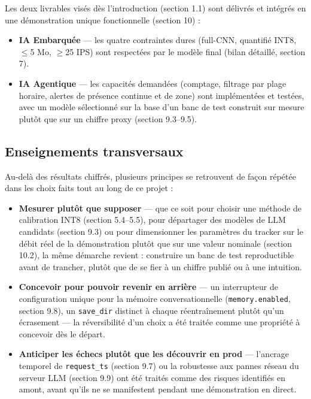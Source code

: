 \documentclass[11pt,a4paper]{article}
\let\Oldsubsection\subsection
\renewcommand{\subsection}{\FloatBarrier\Oldsubsection}
\begin{document}
    Les deux livrables visés dès l'introduction (section 1.1) sont
    délivrés et intégrés en une démonstration unique fonctionnelle (section
    10) :
    
    \begin{itemize}[leftmargin=1.5em]
      \item \textbf{IA Embarquée} --- les quatre contraintes dures
        (full-CNN, quantifié INT8, $\leq$5 Mo, $\geq$25 IPS) sont
        respectées par le modèle final (bilan détaillé, section 7).
      \item \textbf{IA Agentique} --- les capacités demandées (comptage,
        filtrage par plage horaire, alertes de présence continue et de
        zone) sont implémentées et testées, avec un modèle sélectionné sur
        la base d'un banc de test construit sur mesure plutôt que sur un
        chiffre proxy (section 9.3--9.5).
    \end{itemize}
    
    \subsection{Enseignements transversaux}
    
    Au-delà des résultats chiffrés, plusieurs principes se retrouvent de
    façon répétée dans les choix faits tout au long de ce projet :
    
    \begin{itemize}[leftmargin=1.5em]
      \item \textbf{Mesurer plutôt que supposer} --- que ce soit pour
        choisir une méthode de calibration INT8 (section 5.4--5.5), pour
        départager des modèles de LLM candidats (section 9.3) ou pour
        dimensionner les paramètres du tracker sur le débit réel de la
        démonstration plutôt que sur une valeur nominale (section 10.2), la
        même démarche revient : construire un banc de test reproductible
        avant de trancher, plutôt que de se fier à un chiffre publié ou à
        une intuition.
      \item \textbf{Concevoir pour pouvoir revenir en arrière} --- un
        interrupteur de configuration unique pour la mémoire
        conversationnelle (\texttt{memory.enabled}, section 9.8), un
        \texttt{save\_dir} distinct à chaque réentraînement plutôt qu'un
        écrasement --- la réversibilité d'un choix a été traitée comme une
        propriété à concevoir dès le départ.
      \item \textbf{Anticiper les échecs plutôt que les découvrir en
        prod} --- l'ancrage temporel de \texttt{request\_ts} (section 9.7)
        ou la robustesse aux pannes réseau du serveur LLM (section 9.9) ont
        été traités comme des risques identifiés en amont, avant qu'ils ne
        se manifestent pendant une démonstration en direct.
    \end{itemize}
    
\end{document}
